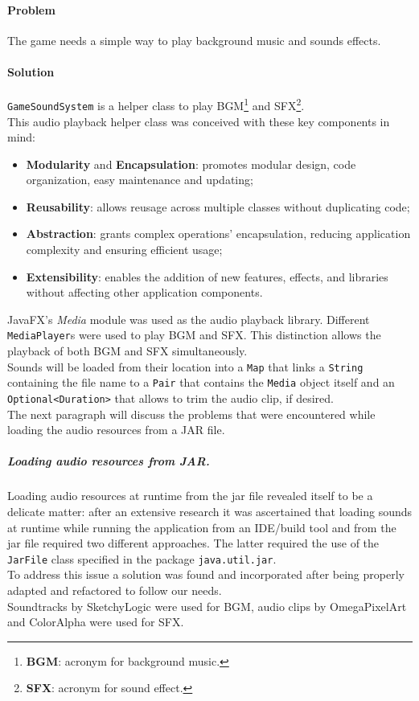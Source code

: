 \documentclass[12pt, a4paper]{report}
\theoremstyle{definition}
\begin{document}
    \paragraph{Problem}
    The game needs a simple way to play background music and sounds effects.
    \paragraph{Solution}
    \verb|GameSoundSystem| is a helper class to play BGM\footnote{\textbf{BGM}: acronym for background music.} and SFX\footnote{\textbf{SFX}: acronym for sound effect.}.\\
    This audio playback helper class was conceived with these key components in mind:

    \begin{itemize}
        \item \textbf{Modularity} and \textbf{Encapsulation}: promotes modular design, code organization, easy maintenance and updating;
        \item \textbf{Reusability}: allows reusage across multiple classes without duplicating code;
        \item \textbf{Abstraction}: grants complex operations' encapsulation, reducing application complexity and ensuring efficient usage;
        \item \textbf{Extensibility}: enables the addition of new features, effects, and libraries without affecting other application components.
    \end{itemize}

    JavaFX's \textit{Media} module was used as the audio playback library. Different \verb|MediaPlayer|s were used to play BGM and SFX.
    This distinction allows the playback of both BGM and SFX simultaneously.\\
    Sounds will be loaded from their location into a \verb|Map| that links a \verb|String| containing the file name to a \verb|Pair| that contains the
    \verb|Media| object itself and an \verb|Optional<Duration>| that allows to trim the audio clip, if desired.\\
    The next paragraph will discuss the problems that were encountered while loading the audio resources from a JAR file.

    \subparagraph{Loading audio resources from JAR.}
    Loading audio resources at runtime from the jar file revealed itself to be a delicate matter: after an extensive research it was ascertained that loading
    sounds at runtime while running the application from an IDE/build tool and from the jar file required two different approaches. The latter required the use
    of the \verb|JarFile| class specified in the package \verb|java.util.jar|.\\
    To address this issue a solution \cite{jarFile} was found and incorporated after being properly adapted and refactored to follow our needs.\\
    Soundtracks by SketchyLogic \cite{bgm} were used for BGM, audio clips by OmegaPixelArt \cite{sfxGB} and ColorAlpha \cite{sfxMenu} were used for SFX.
\end{document}

